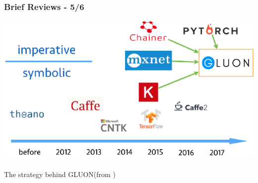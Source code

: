 \documentclass[hyperref={pdfpagelabels=false}]{beamer}
\begin{document}
     \begin{frame}
       \frametitle{Brief Reviews - 5/6}
       \centering
       \includegraphics[scale=0.35]{gluon_strategy.png}
       \\ \scriptsize{\\[5pt]The strategy behind GLUON(from \cite{gluon-tutorial})\\}
     \end{frame}
\end{document}

